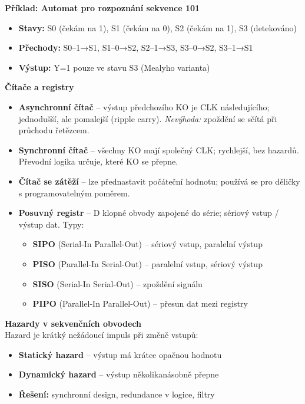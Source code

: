 \documentclass[a4paper,10pt]{article}
\begin{document}
\begin{vysvetlenibox}
\textbf{Příklad: Automat pro rozpoznání sekvence 101}\\
\begin{itemize}[noitemsep, leftmargin=1.4em, topsep=4pt]
    \item \textbf{Stavy:} S0 (čekám na 1), S1 (čekám na 0), S2 (čekám na 1), S3 (detekováno)
    \item \textbf{Přechody:} S0--1→S1, S1--0→S2, S2--1→S3, S3--0→S2, S3--1→S1
    \item \textbf{Výstup:} Y=1 pouze ve stavu S3 (Mealyho varianta)
\end{itemize}

\textbf{Čítače a registry}

\begin{itemize}[noitemsep, leftmargin=1.4em, topsep=4pt]
    \item \textbf{Asynchronní čítač} -- výstup předchozího KO je CLK
          následujícího; jednodušší, ale pomalejší (ripple carry).
          \textit{Nevýhoda:} zpoždění se sčítá při průchodu řetězcem.
    \item \textbf{Synchronní čítač} -- všechny KO mají společný CLK;
          rychlejší, bez hazardů. Převodní logika určuje, které KO se přepne.
    \item \textbf{Čítač se zátěží} -- lze přednastavit počáteční hodnotu;
          používá se pro děličky s programovatelným poměrem.
    \item \textbf{Posuvný registr} -- D klopné obvody zapojené do série;
          sériový vstup / výstup dat. Typy:
          \begin{itemize}[noitemsep, leftmargin=1em]
              \item \textbf{SIPO} (Serial-In Parallel-Out) -- sériový vstup, paralelní výstup
              \item \textbf{PISO} (Parallel-In Serial-Out) -- paralelní vstup, sériový výstup
              \item \textbf{SISO} (Serial-In Serial-Out) -- zpoždění signálu
              \item \textbf{PIPO} (Parallel-In Parallel-Out) -- přesun dat mezi registry
          \end{itemize}
\end{itemize}

\textbf{Hazardy v sekvenčních obvodech}\\
Hazard je krátký nežádoucí impuls při změně vstupů:
\begin{itemize}[noitemsep, leftmargin=1.4em, topsep=4pt]
    \item \textbf{Statický hazard} -- výstup má krátce opačnou hodnotu
    \item \textbf{Dynamický hazard} -- výstup několikanásobně přepne
    \item \textbf{Řešení:} synchronní design, redundance v logice, filtry
\end{itemize}
\end{vysvetlenibox}
\end{document}
